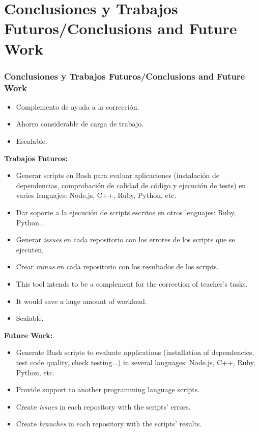 \documentclass{beamer}
\begin{document}
\section{Conclusiones y Trabajos Futuros/Conclusions and Future Work}
\begin{frame}[allowframebreaks]
  \frametitle{Conclusiones y Trabajos Futuros/Conclusions and Future Work}
  
  \begin{itemize}
    \item Complemento de ayuda a la corrección.
    \item Ahorro considerable de carga de trabajo.
    \item Escalable.
  \end{itemize}
  \framebreak
  
  {\bf Trabajos Futuros:}
  \begin{itemize}
    \item Generar scripts en Bash para evaluar aplicaciones (instalación de dependencias, comprobación de calidad de código y ejecución de tests) en varios lenguajes: Node.js, C++, Ruby, Python, etc.
    \item Dar soporte a la ejecución de scripts escritos en otros lenguajes: Ruby, Python...
    \item Generar {\it issues} en cada repositorio con los errores de los scripts que se ejecuten.
    \item Crear {\it ramas} en cada repositorio con los resultados de los scripts.
  \end{itemize}
  \framebreak
  
  \begin{itemize}
    \item This tool intends to be a complement for the correction of teacher's tasks.
    \item It would save a huge amount of workload.
    \item Scalable.
  \end{itemize}
  \framebreak
  
  {\bf Future Work:}
  \begin{itemize}
    \item Generate Bash scripts to evaluate applications (installation of dependencies, test code quality, check testing...) in several languages: Node.js, C++, Ruby, Python, etc.
    \item Provide support to another programming language scripts.
    \item Create {\it issues} in each repository with the scripts' errors. 
    \item Create {\it branches} in each repository with the scripts' results.
  \end{itemize}
\end{frame}
\end{document}
